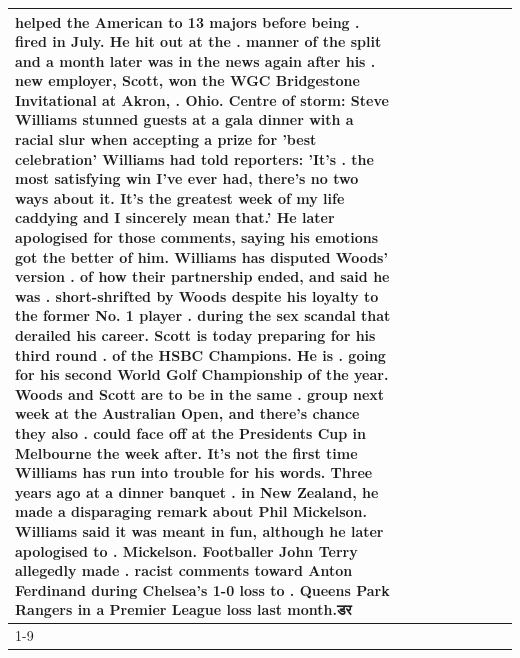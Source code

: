 \begin{table}[H]
\begin{tabular}{lllrlllll}
helped the American to 13 majors before being . fired in July. He hit out at the . manner of the split and a month later was in the news again after his . new employer, Scott, won the WGC Bridgestone Invitational at Akron, . Ohio. Centre of storm: Steve Williams stunned guests at a gala dinner with a racial slur when accepting a prize for 'best celebration' Williams had told reporters: 'It's . the most satisfying win I've ever had, there's no two ways about it. It's the greatest week of my life caddying and I sincerely mean that.' He later apologised for those comments, saying his emotions got the better of him. Williams has disputed Woods' version . of how their partnership ended, and said he was . short-shrifted by Woods despite his loyalty to the former No. 1 player . during the sex scandal that derailed his career. Scott is today preparing for his third round . of the HSBC Champions. He is . going for his second World Golf Championship of the year. Woods and Scott are to be in the same . group next week at the Australian Open, and there's chance they also . could face off at the Presidents Cup in Melbourne the week after. It's not the first time Williams has run into trouble for his words. Three years ago at a dinner banquet . in New Zealand, he made a disparaging remark about Phil Mickelson. Williams said it was meant in fun, although he later apologised to . Mickelson. Footballer John Terry allegedly made . racist comments toward Anton Ferdinand during Chelsea's 1-0 loss to . Queens Park Rangers in a Premier League loss last month.डर \\
\cline{1-9}

\end{tabular}
\end{table}
